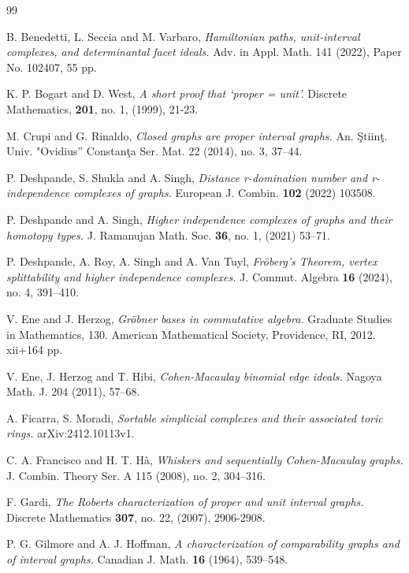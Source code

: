 \documentclass[12pt,reqno]{amsart}
\theoremstyle{plain}
\theoremstyle{definition}
\numberwithin{equation}{section}
\begin{document}



\begin{thebibliography}{99}

 B. Benedetti, L. Seccia and M. Varbaro, {\it Hamiltonian paths, unit-interval complexes, and determinantal facet ideals.} Adv. in Appl. Math. 141 (2022), Paper No. 102407, 55 pp.

  K. P. Bogart and D. West, {\it A short proof that ‘proper = unit’.} Discrete Mathematics,  \textbf{201}, no. 1, (1999),  21-23.

 M. Crupi and G. Rinaldo, {\it Closed graphs are proper interval graphs.} An. Ştiinţ. Univ. "Ovidius'' Constanţa Ser. Mat. 22 (2014), no. 3, 37--44.

  P. Deshpande, S. Shukla and A. Singh, {\it Distance r-domination number and r-independence
complexes of graphs.} European J. Combin. {\bf 102} (2022) 103508.

   P. Deshpande and A. Singh, {\it Higher independence complexes of graphs and their
homotopy types.} J. Ramanujan Math. Soc. {\bf 36}, no. 1, (2021) 53–71.

 P. Deshpande, A. Roy, A. Singh and A. Van Tuyl, {\it Fröberg's Theorem, vertex splittability and higher independence complexes.} J. Commut. Algebra {\bf 16} (2024), no. 4, 391--410.

 V. Ene and J. Herzog, {\it Gr\"{o}bner bases in commutative algebra.} Graduate Studies in Mathematics, 130. American Mathematical Society, Providence, RI, 2012. xii+164 pp.

 V. Ene, J. Herzog and T. Hibi, {\it Cohen-Macaulay binomial edge ideals.} Nagoya Math. J. 204 (2011), 57--68.

 A. Ficarra, S. Moradi, {\it Sortable simplicial complexes and their associated toric rings.} arXiv:2412.10113v1.

 C. A. Francisco and H. T.  H\`{a}, {\it Whiskers and sequentially Cohen-Macaulay graphs.} J. Combin. Theory Ser. A 115 (2008), no. 2, 304--316.

 F. Gardi, {\it The Roberts characterization of proper and unit interval graphs.} Discrete Mathematics \textbf{307}, no. 22, (2007), 2906-2908.

 P. G. Gilmore and A. J. Hoffman, {\it A characterization of comparability graphs and of interval graphs.} Canadian J. Math. {\bf 16} (1964), 539--548.
 

\end{thebibliography}
\end{document}
